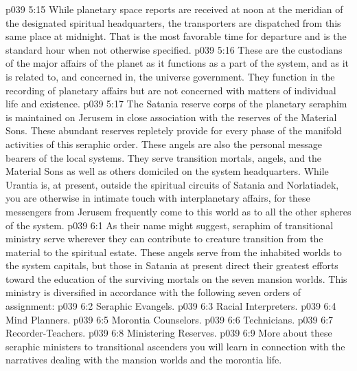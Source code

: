 \vs p039 5:15 \pc While planetary space reports are received at noon at the meridian of the designated spiritual headquarters, the transporters are dispatched from this same place at midnight. That is the most favorable time for departure and is the standard hour when not otherwise specified.
\vs p039 5:16 \pc {}\bibnobreakspace {} These are the custodians of the major affairs of the planet as it functions as a part of the system, and as it is related to, and concerned in, the universe government. They function in the recording of planetary affairs but are not concerned with matters of individual life and existence.
\vs p039 5:17 \pc {}\bibnobreakspace {} The Satania reserve corps of the planetary seraphim is maintained on Jerusem in close association with the reserves of the Material Sons. These abundant reserves repletely provide for every phase of the manifold activities of this seraphic order. These angels are also the personal message bearers of the local systems. They serve transition mortals, angels, and the Material Sons as well as others domiciled on the system headquarters. While Urantia is, at present, outside the spiritual circuits of Satania and Norlatiadek, you are otherwise in intimate touch with interplanetary affairs, for these messengers from Jerusem frequently come to this world as to all the other spheres of the system.
\vs p039 6:1 As their name might suggest, seraphim of transitional ministry serve wherever they can contribute to creature transition from the material to the spiritual estate. These angels serve from the inhabited worlds to the system capitals, but those in Satania at present direct their greatest efforts toward the education of the surviving mortals on the seven mansion worlds. This ministry is diversified in accordance with the following seven orders of assignment:
\vs p039 6:2 \bibnobreakspace Seraphic Evangels.
\vs p039 6:3 \bibnobreakspace Racial Interpreters.
\vs p039 6:4 \bibnobreakspace Mind Planners.
\vs p039 6:5 \bibnobreakspace Morontia Counselors.
\vs p039 6:6 \bibnobreakspace Technicians.
\vs p039 6:7 \bibnobreakspace Recorder\hyp{}Teachers.
\vs p039 6:8 \bibnobreakspace Ministering Reserves.
\vs p039 6:9 \pc More about these seraphic ministers to transitional ascenders you will learn in connection with the narratives dealing with the mansion worlds and the morontia life.
